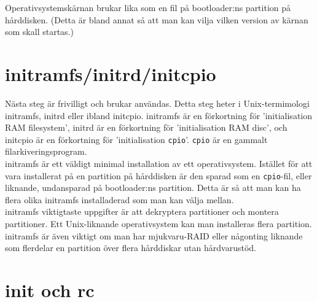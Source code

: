 \documentclass[12pt,a4paper]{article}
\begin{document}
\noindent
Operativsystemskärnan brukar lika som en fil på
bootloader:ns partition på hårddisken. (Detta är
bland annat så att man kan vilja vilken version
av kärnan som skall startas.)


\section*{initramfs/initrd/initcpio}

Nästa steg är frivilligt och brukar användas.
Detta steg heter i Unix-ter\-mi\-mo\-lo\-gi initramfs,
initrd eller ibland initcpio. initramfs är en
förkortning för 'initialisation RAM filesystem',
initrd är en förkortning för 'initialisation RAM
disc', och initcpio är en förkortning för
'initialisation \texttt{cpio}'. \texttt{cpio} är
en gammalt filarkiveringsprogram.
\\

\noindent
initramfs är ett väldigt minimal installation
av ett operativsystem. Istället för att vara
installerat på en partition på hårddisken är
den sparad som en \texttt{cpio}-fil, eller
liknande, undansparad på bootloader:ns partition.
Detta är så att man kan ha flera olika initramfs
installaderad som man kan välja mellan.
\\

\noindent
initramfs viktigtaste uppgifter är att dekryptera
partitioner och montera partitioner. Ett
Unix-liknande operativsystem kan man installeras
flera partition. initramfs är även viktigt om
man har mjukvaru-RAID eller någonting liknande
som flerdelar en partition över flera hårddiskar
utan hårdvarustöd.


\section*{init och rc}
\end{document}
